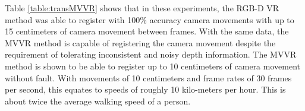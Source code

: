 Table \ref{table:transMVVR} shows that in these experiments, the RGB-D VR method was able to register with 100\% accuracy camera movements with up to 15 centimeters of camera movement between frames. With the same data, the MVVR method is capable of registering the camera movement despite the requirement of tolerating inconsistent and noisy depth information. The MVVR method is shown to be able to register up to 10 centimeters of camera movement without fault. With movements of 10 centimeters and frame rates of 30 frames per second, this equates to speeds of roughly 10 kilo-meters per hour. This is about twice the average walking speed of a person. \\

